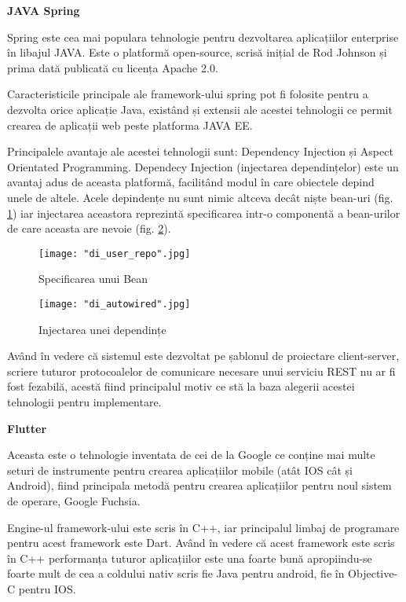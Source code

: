\documentclass[a4paper, 12pt]{article}
\begin{document}
	\textbf{JAVA Spring \cite{tutorialspoint.com}}
	
	\qquad Spring este cea mai populara tehnologie pentru dezvoltarea aplicațiilor enterprise în libajul JAVA. Este o platformă open-source, scrisă inițial de Rod Johnson și prima dată publicată cu licența Apache 2.0.
	
	\qquad Caracteristicile principale ale framework-ului spring pot fi folosite pentru a dezvolta orice aplicație Java, existând și extensii ale acestei tehnologii ce permit crearea de aplicații web peste platforma JAVA EE. \textbf{\cite{tutorialspoint.com}}
	
	\qquad Principalele avantaje ale acestei tehnologii sunt: Dependency Injection și Aspect Orientated Programming. Dependecy Injection (injectarea dependințelor) este un avantaj adus de aceasta platformă, facilitând modul în care obiectele depind unele de altele. Acele depindențe nu sunt nimic altceva decât niște bean-uri (fig. \ref{fig:user_repo}) iar injectarea aceastora reprezintă specificarea intr-o componentă a bean-urilor de care aceasta are nevoie (fig. \ref{fig:di_autowired}).
	
	\begin{figure}[H]
		\centering
		\texttt{[image: "di\_user\_repo".jpg]}
		\caption{Specificarea unui Bean}\label{fig:user_repo}
	\end{figure}
	
	\begin{figure}[H]
		\centering
		\texttt{[image: "di\_autowired".jpg]}
		\caption{Injectarea unei dependințe}\label{fig:di_autowired}
	\end{figure}
	
	
	\qquad Având în vedere că sistemul este dezvoltat pe șablonul de proiectare client-server, scriere tuturor protocoalelor de comunicare necesare unui serviciu REST nu ar fi fost fezabilă, acestă fiind principalul motiv ce stă la baza alegerii acestei tehnologii pentru implementare.
	
	\newpage
	\textbf{Flutter \cite{flutterbygoogle}}
	
	\qquad Aceasta este o tehnologie inventata de cei de la Google ce conține mai multe seturi de instrumente pentru crearea aplicațiilor mobile (atât IOS cât și Android), fiind principala metodă pentru crearea aplicațiilor pentru noul sistem de operare, Google Fuchsia.
	
	\qquad Engine-ul framework-ului este scris în C++, iar principalul limbaj de programare pentru acest framework este Dart. Având în vedere că acest framework este scris în C++ performanța tuturor aplicațiilor este una foarte bună apropiindu-se foarte mult de cea a coldului nativ scris fie Java pentru android, fie în Objective-C pentru IOS.
	
\end{document}

